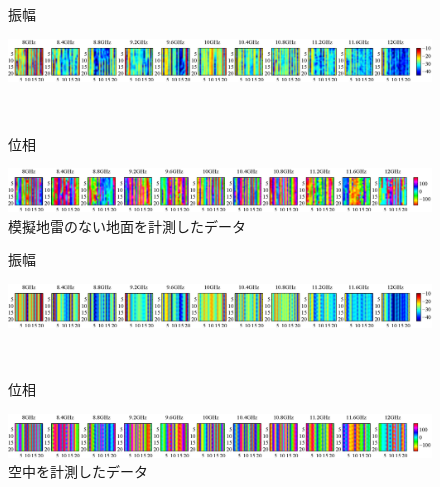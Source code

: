 ﻿\documentclass[12pt,oneside]{jsbook}
\begin{document}
\begin{figure}[hbtp]
 \begin{center}
     \begin{minipage}[c]{0.19\hsize}
振幅
  \end{minipage}
     \begin{minipage}[c]{0.79\hsize}
\includegraphics[width = \hsize ]{20150204_none1_raw_a.eps}
  \end{minipage}
\\
     \begin{minipage}[c]{0.19\hsize}
位相
  \end{minipage}
     \begin{minipage}[c]{0.8\hsize}
\includegraphics[width =\hsize ]{20150204_none1_raw_p.eps}
  \end{minipage}
\caption{模擬地雷のない地面を計測したデータ}
\label{none-raw} 
 \end{center}
\end{figure}
\begin{figure}[hbtp]
 \begin{center}
     \begin{minipage}[c]{0.19\hsize}
振幅
  \end{minipage}
     \begin{minipage}[c]{0.79\hsize}
\includegraphics[width = \hsize ]{20150206_direct2_raw_a.eps}
  \end{minipage}
\\
     \begin{minipage}[c]{0.19\hsize}
位相
  \end{minipage}
     \begin{minipage}[c]{0.8\hsize}
\includegraphics[width =\hsize ]{20150206_direct2_raw_p.eps}
  \end{minipage}
\caption{空中を計測したデータ}
\label{direct-raw}
 \end{center}
\end{figure}
\end{document}
